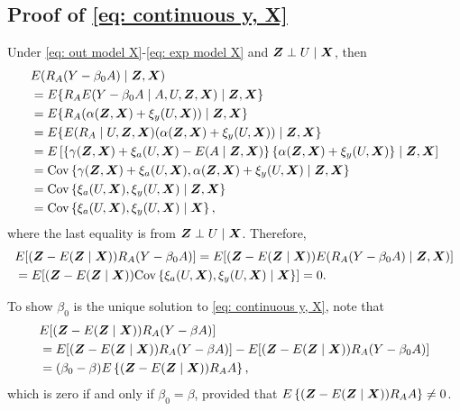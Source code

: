 \documentclass[12pt]{article}
\begin{document}
{\subsection{Proof of \eqref{eq: continuous y, X}}
Under \eqref{eq: out model X}-\eqref{eq: exp model X} and $ \bm{Z}\perp U\mid\bm{X} $, then
\begin{align}
	& E(R_A( Y- \beta_0 A)\mid\bm{Z}, \bm{X})\nonumber\\
	&=E\{R_AE( Y- \beta_0 A\mid A, U, \bm{Z}, \bm{X})\mid\bm{Z}, \bm{X}\}\nonumber\\
	&=E\{R_A(\alpha(\bm{Z}, \bm{X})+ \xi_y(U, \bm{X}))\mid\bm{Z}, \bm{X}\}\nonumber\\
	&=E\{E(R_A\mid U, \bm{Z}, \bm{X})(\alpha(\bm{Z}, \bm{X})+ \xi_y(U, \bm{X}))\mid\bm{Z}, \bm{X}\} \nonumber\\
	&=E\left[\left\{\gamma (\bm{Z}, \bm{X})+ \xi_a(U, \bm{X})- E(A\mid\bm{Z}, \bm{X})\right\}\left\{\alpha(\bm{Z}, \bm{X})+ \xi_y(U, \bm{X})\right\}\mid\bm{Z}, \bm{X}\right] \nonumber\\
	&=\mbox{Cov} \left\{\gamma (\bm{Z}, \bm{X})+ \xi_a(U, \bm{X}),\alpha(\bm{Z}, \bm{X})+ \xi_y(U, \bm{X})\mid\bm{Z}, \bm{X}\right\}\nonumber \\
	&=\mbox{Cov} \left\{ \xi_a(U, \bm{X}), \xi_y(U, \bm{X})\mid\bm{Z}, \bm{X}\right\} \nonumber\\
	&=\mbox{Cov} \left\{ \xi_a(U, \bm{X}), \xi_y(U, \bm{X})\mid \bm{X}\right\} \label{seq: conditional mean 1},
\end{align}
where the last equality is from $ \bm{Z}\perp U\mid\bm{X} $. Therefore, 
\begin{align*}
&	E[(\bm{Z}- E(\bm{Z}\mid\bm{X})) R_A( Y- \beta_0 A)] = E[(\bm{Z}- E(\bm{Z}\mid\bm{X})) E(R_A( Y- \beta_0 A) \mid\bm{Z}, \bm{X})]  \\
	&= E[(\bm{Z}- E(\bm{Z}\mid\bm{X}))  \mbox{Cov} \left\{ \xi_a(U, \bm{X}), \xi_y(U, \bm{X})\mid \bm{X}\right\}  ]= 0.
\end{align*}

To show $ \beta_0 $ is the unique solution to  \eqref{eq: continuous y, X}, note that 
\begin{align*}
	&E[(\bm{Z}- E(\bm{Z}\mid\bm{X})) R_A( Y- \beta A)]\\ 
	&=E[(\bm{Z}- E(\bm{Z}\mid\bm{X})) R_A( Y- \beta A) ] - E[(\bm{Z}- E(\bm{Z}\mid\bm{X})) R_A ( Y- \beta_0 A) ] \\
	&= (\beta_0-\beta)  E\left\{ (\bm{Z}- E(\bm{Z}\mid\bm{X})) R_A A    \right\} \nonumber,
\end{align*}
which is zero if and only if $ \beta_0=\beta $, provided that  $ E\left\{ (\bm{Z}- E(\bm{Z}\mid\bm{X})) R_A A    \right\}\neq 0 $.

}
\end{document}

